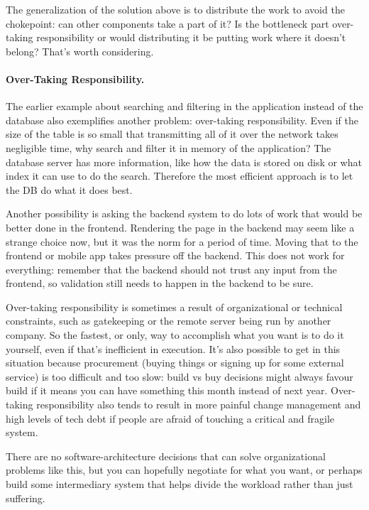 The generalization of the solution above is to distribute the work to avoid the chokepoint: can other components take a part of it? Is the bottleneck part over-taking responsibility or would distributing it be putting work where it doesn't belong? That's worth considering.

\paragraph{Over-Taking Responsibility.}
The earlier example about searching and filtering in the application instead of the database also exemplifies another problem: over-taking responsibility. Even if the size of the table is so small that transmitting all of it over the network takes negligible time, why search and filter it in memory of the application? The database server has more information, like how the data is stored on disk or what index it can use to do the search. Therefore the most efficient approach is to let the DB do what it does best.

Another possibility is asking the backend system to do lots of work that would be better done in the frontend. Rendering the page in the backend may seem like a strange choice now, but it was the norm for a period of time. Moving that to the frontend or mobile app takes pressure off the backend.  This does not work for everything: remember that the backend should not trust any input from the frontend, so validation still needs to happen in the backend to be sure.

Over-taking responsibility is sometimes a result of organizational or technical constraints, such as gatekeeping or the remote server being run by another company. So the fastest, or only, way to accomplish what you want is to do it yourself, even if that's inefficient in execution. It's also possible to get in this situation because procurement (buying things or signing up for some external service) is too difficult and too slow: build vs buy decisions might always favour build if it means you can have something this month instead of next year. Over-taking responsibility also tends to result in more painful change management and high levels of tech debt if people are afraid of touching a critical and fragile system.

There are no software-architecture decisions that can solve organizational problems like this, but you can hopefully negotiate for what you want, or perhaps build some intermediary system that helps divide the workload rather than just suffering.



